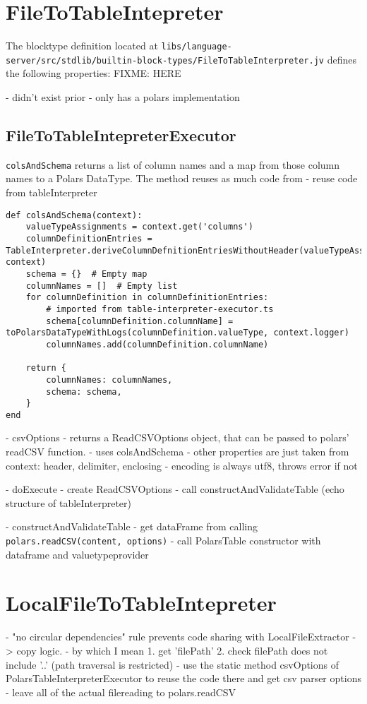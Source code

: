 \section{FileToTableIntepreter}
The blocktype definition located at \Verb|libs/language-server/src/stdlib/builtin-block-types/FileToTableInterpreter.jv| defines the following properties:
FIXME: HERE


- didn't exist prior
- only has a polars implementation

\subsection{FileToTableIntepreterExecutor}
\Verb|colsAndSchema| returns a list of column names and a map from those column names to a Polars DataType.
The method reuses as much code from
- reuse code from tableInterpreter
\begin{listing}
	\begin{verbatim}
def colsAndSchema(context):
	valueTypeAssignments = context.get('columns')
	columnDefinitionEntries = TableInterpreter.deriveColumnDefnitionEntriesWithoutHeader(valueTypeAssignments, context)
	schema = {}  # Empty map
	columnNames = []  # Empty list
	for columnDefinition in columnDefinitionEntries:
		# imported from table-interpreter-executor.ts
		schema[columnDefinition.columnName] = toPolarsDataTypeWithLogs(columnDefinition.valueType, context.logger)
		columnNames.add(columnDefinition.columnName)

	return {
		columnNames: columnNames,
		schema: schema,
	}
end
	\end{verbatim}
\end{listing}

- csvOptions
- returns a ReadCSVOptions object, that can be passed to polars' readCSV function.
- uses colsAndSchema
- other properties are just taken from context: header, delimiter, enclosing
- encoding is always utf8, throws error if not

- doExecute
- create ReadCSVOptions
- call constructAndValidateTable (echo structure of tableInterpreter)

- constructAndValidateTable
- get dataFrame from calling \Verb|polars.readCSV(content, options)|
- call PolarsTable constructor with dataframe and valuetypeprovider

\section{LocalFileToTableIntepreter}
- "no circular dependencies" rule prevents code sharing with LocalFileExtractor -> copy logic.
- by which I mean 1. get 'filePath' 2. check filePath does not include '..' (path traversal is restricted)
- use the static method csvOptions of PolarsTableInterpreterExecutor to reuse the code there and get csv parser options
- leave all of the actual filereading to polars.readCSV


